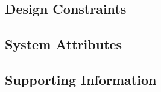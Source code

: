 \subsection{Design Constraints}

\subsection{System Attributes}

\subsection{Supporting Information}
